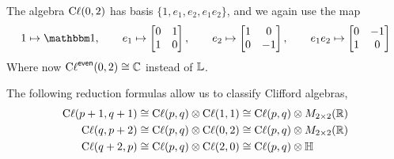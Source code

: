 \begin{example}
    The algebra $\operatorname{C\ell}(0,2)$ has basis $\{1,e_1,e_2,e_1e_2\}$, and we again use the map
    \[1\mapsto \One, \qquad e_1 \mapsto \m{0&1\\1&0},\qquad e_2 \mapsto \m{1&0\\0&-1},\qquad e_1e_2 \mapsto \m{0&-1\\1&0}\]
    Where now $\operatorname{C\ell}^{\textsf{even}}(0,2)\cong \operatorname{\mathbb{C}}$ instead of $\operatorname{\mathbb{L}}$.
\end{example}
\begin{lemma} The following reduction formulas allow us to classify Clifford algebras,
    \begin{align}
        \operatorname{C\ell}(p+1,q+1) &\cong \operatorname{C\ell}(p,q)\otimes \operatorname{C\ell}(1,1)\cong \operatorname{C\ell}(p,q)\otimes M_{2\times 2}(\operatorname{\mathbb{R}})\\
        \operatorname{C\ell}(q,p+2) &\cong \operatorname{C\ell}(p,q)\otimes \operatorname{C\ell}(0,2) \cong \operatorname{C\ell}(p,q)\otimes M_{2\times 2}(\operatorname{\mathbb{R}})\\
        \operatorname{C\ell}(q+2,p) &\cong \operatorname{C\ell}(p,q)\otimes \operatorname{C\ell}(2,0)\cong \operatorname{C\ell}(p,q)\otimes \operatorname{\mathbb{H}}
    \end{align}
\end{lemma}
